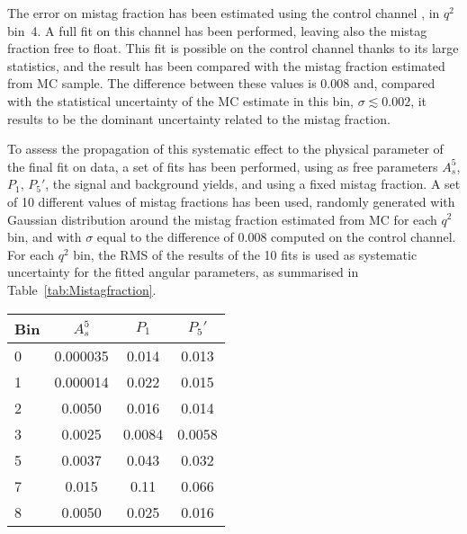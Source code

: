 The error on mistag fraction has been estimated using the control channel \BtoKstJpsi, in $q^2$ bin~4.
A full fit on this channel has been performed, leaving also the mistag fraction free to float.
This fit is possible on the control channel thanks to its large statistics, and the result has been compared with the mistag fraction estimated from MC sample.
The difference between these values is 0.008 and, compared with the statistical uncertainty of the MC estimate in this bin, $\sigma\lesssim0.002$, it results to be the dominant uncertainty related to the mistag fraction.

To assess the propagation of this systematic effect to the physical parameter of the final fit on data, a set of fits has been performed, using as free parameters $A_s^5$, $P_1$, $P_5'$, the signal and background yields, and using a fixed mistag fraction.
A set of 10 different values of mistag fractions has been used, randomly generated with Gaussian distribution around the mistag fraction estimated from MC for each $q^2$ bin, and with $\sigma$ equal to the difference of 0.008 computed on the control channel.
For each $q^2$ bin, the RMS of the results of the 10 fits is used as systematic uncertainty for the fitted angular parameters, as summarised in Table~\ref{tab:Mistagfraction}.

\begin{table*}[!htb]
  \begin {center}
    \caption{Systematic uncertainties: mistag fraction.\label{tab:Mistagfraction}}
    \begin{tabular}{l|c|c|c}
      Bin & $A_s^5$  & $P_1$ & $P_5'$  \\
      \hline
      \hline
      0  & 0.000035 & 0.014  &  0.013 \\
      1  & 0.000014 & 0.022  &  0.015 \\
      2  & 0.0050   & 0.016  &  0.014 \\ 
      3  & 0.0025   & 0.0084 &  0.0058\\ 
      5  & 0.0037   & 0.043  &  0.032  \\ 
      7  & 0.015    & 0.11   &  0.066 \\
      8  & 0.0050   & 0.025  &  0.016 \\
    \end{tabular}

  \end{center}
\end{table*}

